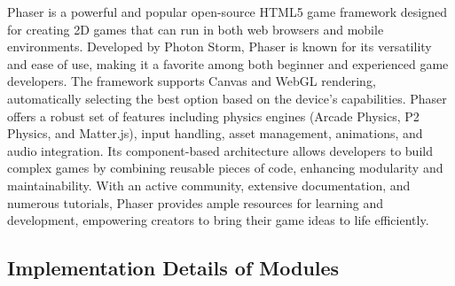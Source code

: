Phaser is a powerful and popular open-source HTML5 game framework designed for creating 2D games that can run in both web browsers and mobile environments. Developed by Photon Storm, Phaser is known for its versatility and ease of use, making it a favorite among both beginner and experienced game developers. The framework supports Canvas and WebGL rendering, automatically selecting the best option based on the device's capabilities. Phaser offers a robust set of features including physics engines (Arcade Physics, P2 Physics, and Matter.js), input handling, asset management, animations, and audio integration. Its component-based architecture allows developers to build complex games by combining reusable pieces of code, enhancing modularity and maintainability. With an active community, extensive documentation, and numerous tutorials, Phaser provides ample resources for learning and development, empowering creators to bring their game ideas to life efficiently.
\subsection{Implementation Details of Modules}
